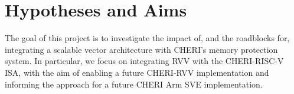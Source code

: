 \documentclass[../thesis]{subfiles}
\begin{document}




\section{Hypotheses and Aims}
The goal of this project is to investigate the impact of, and the roadblocks for, integrating a scalable vector architecture with CHERI's memory protection system.
In particular, we focus on integrating RVV with the CHERI-RISC-V ISA, with the aim of enabling a future CHERI-RVV implementation and informing the approach for a future CHERI Arm SVE implementation.
\end{document}
